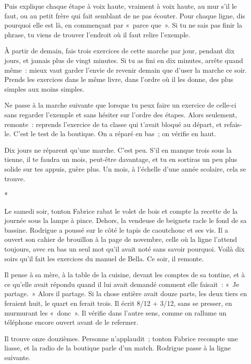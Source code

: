 \documentclass[10.5pt,twoside,openright]{book}
\newcommand{\asterisme}{\par\vspace{0.7em}\centerline{\color{gris}*\quad*\quad*}\vspace{0.7em}\par\noindent}
\begin{document}
Puis explique chaque étape à voix haute, vraiment à voix haute, au mur s’il le faut, ou au petit frère qui fait semblant de ne pas écouter. Pour chaque ligne, dis pourquoi elle est là, en commençant par « parce que ». Si tu ne sais pas finir la phrase, tu viens de trouver l’endroit où il faut relire l’exemple.

À partir de demain, fais trois exercices de cette marche par jour, pendant dix jours, et jamais plus de vingt minutes. Si tu as fini en dix minutes, arrête quand même : mieux vaut garder l’envie de revenir demain que d’user la marche ce soir. Prends les exercices dans le même livre, dans l’ordre où il les donne, des plus simples aux moins simples.

Ne passe à la marche suivante que lorsque tu peux faire un exercice de celle-ci sans regarder l’exemple et sans hésiter sur l’ordre des étapes. Alors seulement, remonte : reprends l’exercice de ta classe qui t’avait bloqué au départ, et refais-le. C’est le test de la boutique. On a réparé en bas ; on vérifie en haut.

Dix jours ne réparent qu’une marche. C’est peu. S’il en manque trois sous la tienne, il te faudra un mois, peut-être davantage, et tu en sortiras un peu plus solide sur tes appuis, guère plus. Un mois, à l’échelle d’une année scolaire, cela se trouve.

\asterisme

Le samedi soir, tonton Fabrice rabat le volet de bois et compte la recette de la journée sous la lampe à pince. Dehors, la vendeuse de beignets racle le fond de sa bassine. Rodrigue a poussé sur le côté le tapis de caoutchouc et ses vis. Il a ouvert son cahier de brouillon à la page de novembre, celle où la ligne l’attend toujours, avec en bas un seul mot qu’il avait noté sans savoir pourquoi. Voilà dix soirs qu’il fait les exercices du manuel de Bella. Ce soir, il remonte.

Il pense à sa mère, à la table de la cuisine, devant les comptes de sa tontine, et à ce qu’elle avait répondu quand il lui avait demandé comment elle faisait : « Je partage. » Alors il partage. Si la chose entière avait douze parts, les deux tiers en feraient huit, le quart en ferait trois. Il écrit 8/12 + 3/12, sans se presser, en murmurant les « donc ». Il vérifie dans l’autre sens, comme on rallume un téléphone encore ouvert avant de le refermer.

Il trouve onze douzièmes. Personne n’applaudit ; tonton Fabrice recompte une liasse, et la radio de la boutique parle d’un match. Rodrigue passe à la ligne suivante.
\end{document}
